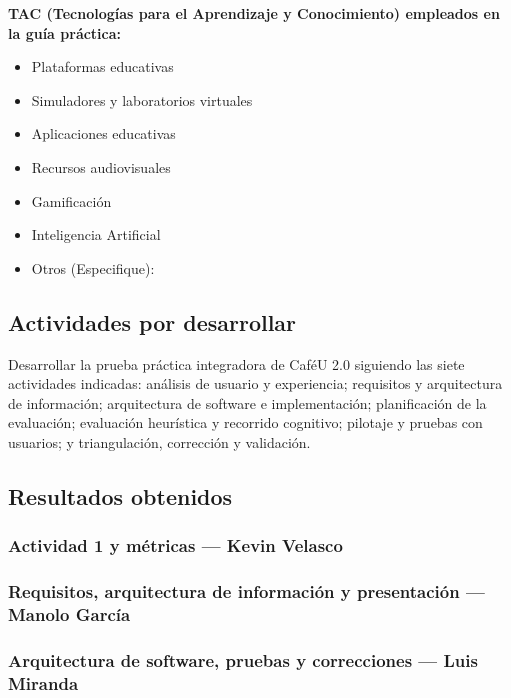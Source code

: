 \documentclass{article}
\begin{document}
\textbf{TAC (Tecnologías para el Aprendizaje y Conocimiento) empleados en la guía práctica:}
\begin{itemize}
    \item[$\square$] Plataformas educativas
    \item[$\square$] Simuladores y laboratorios virtuales
    \item[$\square$] Aplicaciones educativas
    \item[$\square$] Recursos audiovisuales
    \item[$\square$] Gamificación
    \item[$\blacksquare$] Inteligencia Artificial
    \item Otros (Especifique): \underline{\hspace{5cm}}
\end{itemize}

\subsection{Actividades por desarrollar}
Desarrollar la prueba práctica integradora de CaféU 2.0 siguiendo las siete actividades indicadas: análisis de usuario y experiencia; requisitos y arquitectura de información; arquitectura de software e implementación; planificación de la evaluación; evaluación heurística y recorrido cognitivo; pilotaje y pruebas con usuarios; y triangulación, corrección y validación.

\subsection{Resultados obtenidos}
\subsubsection{Actividad 1 y métricas --- Kevin Velasco}


\subsubsection{Requisitos, arquitectura de información y presentación --- Manolo García}


\subsubsection{Arquitectura de software, pruebas y correcciones --- Luis Miranda}

\end{document}
